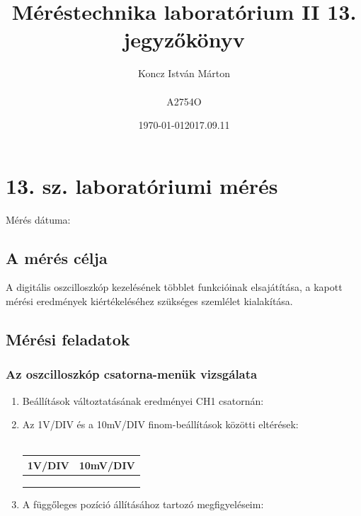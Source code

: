 \documentclass[10pt,a4paper]{article}
\begin{document}
\title{Méréstechnika laboratórium II 13. jegyzőkönyv}
\author{Koncz István Márton\\\\A2754O}
\date{\today}
\maketitle
\newpage
\section{13. sz. laboratóriumi mérés}
	Mérés dátuma:\date{2017.09.11}
	\subsection{A mérés célja}
	A digitális oszcilloszkóp kezelésének többlet funkcióinak
elsajátítása, a kapott mérési eredmények kiértékeléséhez
szükséges szemlélet kialakítása.
	\subsection{Mérési feladatok}
		\subsubsection{Az oszcilloszkóp csatorna-menük vizsgálata}
		\begin{enumerate}
			\item Beállítások változtatásának eredményei CH1 csatornán:
				$$$$ $$$$ $$$$ $$$$ $$$$
			\item Az 1V/DIV és a 10mV/DIV finom-beállítások közötti eltérések:\\\\
			\begin{tabular}{|c|c|}
			\hline 
			1V/DIV & 10mV/DIV \\ 
			\hline 
			 &  \\ 
			\hline 
			 &  \\ 
			\hline 
			 &  \\ 
			\hline 
			\end{tabular}
			\item A függőleges pozíció állításához tartozó megfigyeléseim:
				$$$$ $$$$ $$$$		 
		\end{enumerate}
\end{document}
